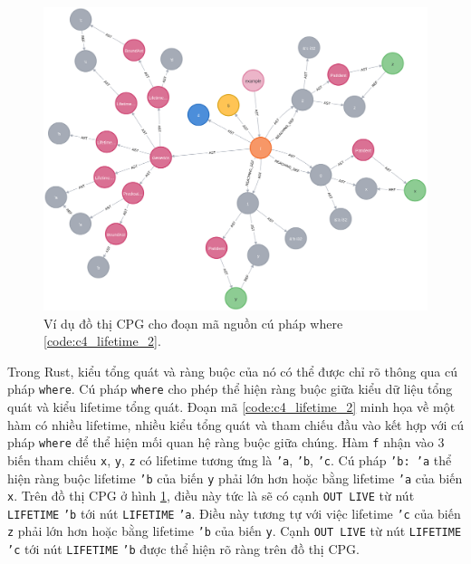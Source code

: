 \begin{figure}[H]
    \includegraphics[width=1\columnwidth]{figures/c4/c4_lifetime_2.png}
    \centering
    \caption{Ví dụ đồ thị CPG cho đoạn mã nguồn cú pháp where \ref{code:c4_lifetime_2}.}
    \label{img:c4_lifetime_2}
\end{figure}

Trong Rust, kiểu tổng quát và ràng buộc của nó có thể được chỉ rõ thông qua cú pháp \texttt{where}.
Cú pháp \texttt{where} cho phép thể hiện ràng buộc giữa kiểu dữ liệu tổng quát và kiểu lifetime tổng quát.
Đoạn mã \ref{code:c4_lifetime_2} minh họa về một hàm có nhiều lifetime, nhiều kiểu tổng quát và tham chiếu đầu vào kết hợp với cú pháp \texttt{where} để thể hiện mối quan hệ ràng buộc giữa chúng.
Hàm \texttt{f} nhận vào 3 biến tham chiếu \texttt{x}, \texttt{y}, \texttt{z} có lifetime tương ứng là \texttt{'a}, \texttt{'b}, \texttt{'c}.
Cú pháp \texttt{'b: 'a} thể hiện ràng buộc lifetime \texttt{'b} của biến \texttt{y} phải lớn hơn hoặc bằng lifetime \texttt{'a} của biến \texttt{x}.
Trên đồ thị CPG ở hình \ref{img:c4_lifetime_2}, điều này tức là sẽ có cạnh \texttt{OUT LIVE} từ nút \texttt{LIFETIME} \texttt{'b} tới nút \texttt{LIFETIME} \texttt{'a}.
Điều này tương tự với việc lifetime \texttt{'c} của biến \texttt{z} phải lớn hơn hoặc bằng lifetime \texttt{'b} của biến \texttt{y}.
Cạnh \texttt{OUT LIVE} từ nút \texttt{LIFETIME} \texttt{'c} tới nút \texttt{LIFETIME} \texttt{'b} được thể hiện rõ ràng trên đồ thị CPG.

